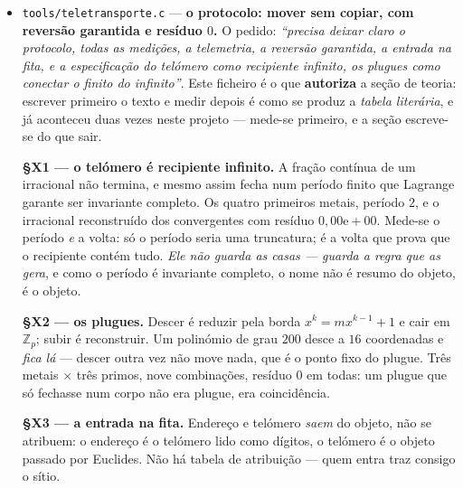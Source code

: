 \documentclass[11pt]{article}
\newcommand{\code}[1]{\texttt{\small #1}}
\theoremstyle{plain}
\theoremstyle{remark}
\begin{document}
\begin{itemize}
\emph{E o §R1 era uma asserção vazia anterior:} somava os mesmos quadrados em duas ordens e comparava
--- a soma é comutativa e são inteiros, nenhuma entrada a fazia falhar. O que a torre dual afirma é
que \textbf{a descida não perde}: desce-se guardando os saldos, sobe-se repondo-os, e o vetor volta
exato --- agora com \textbf{controlo positivo}, porque um andar perdido de propósito tem de ser
detetado, e é.

E \code{assistente.sh} liga a coisa toda: o corpus responde o que sabe; o \textbf{decreto}
(\emph{``não sei''}, o único dos três métodos sem dual) passa a palavra ao \code{forward} local ---
disco e CPU, sem ollama, sem servidor, sem GPU --- e a resposta \emph{volta para o corpus}. Da
segunda vez o modelo não é acordado.

\item \code{tools/teletransporte.c} --- \textbf{o protocolo: mover sem copiar, com reversão
garantida e resíduo $0$.} O pedido: \emph{``precisa deixar claro o protocolo, todas as medições, a
telemetria, a reversão garantida, a entrada na fita, e a especificação do telómero como recipiente
infinito, os plugues como conectar o finito do infinito''}. Este ficheiro é o que \textbf{autoriza} a
seção de teoria: escrever primeiro o texto e medir depois é como se produz a \emph{tabela literária},
e já aconteceu duas vezes neste projeto --- mede-se primeiro, e a seção escreve-se do que sair.

\textbf{§X1 --- o telómero é recipiente infinito.} A fração contínua de um irracional não termina, e
mesmo assim fecha num período finito que Lagrange garante ser invariante completo. Os quatro
primeiros metais, período $2$, e o irracional reconstruído dos convergentes com resíduo
$0{,}00\mathrm{e}{+}00$. Mede-se o período \emph{e} a volta: só o período seria uma truncatura; é a
volta que prova que o recipiente contém tudo. \emph{Ele não guarda as casas --- guarda a regra que as
gera}, e como o período é invariante completo, o nome não é resumo do objeto, é o objeto.

\textbf{§X2 --- os plugues.} Descer é reduzir pela borda $x^k=m x^{k-1}+1$ e cair em $\mathbb{Z}_p$;
subir é reconstruir. Um polinómio de grau $200$ desce a $16$ coordenadas e \emph{fica lá} --- descer
outra vez não move nada, que é o ponto fixo do plugue. Três metais $\times$ três primos, nove
combinações, resíduo $0$ em todas: um plugue que só fechasse num corpo não era plugue, era
coincidência.

\textbf{§X3 --- a entrada na fita.} Endereço e telómero \emph{saem} do objeto, não se atribuem: o
endereço é o telómero lido como dígitos, o telómero é o objeto passado por Euclides. Não há tabela de
atribuição --- quem entra traz consigo o sítio.


\end{itemize}
\end{document}

